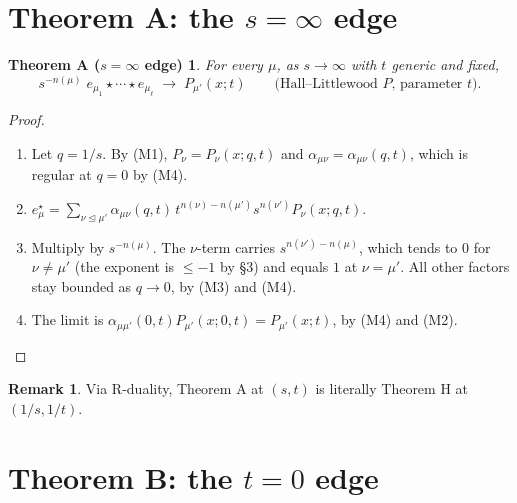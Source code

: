 \documentclass[11pt]{article}
\newtheorem*{theoremA}{Theorem A ($s=\infty$ edge)}
\theoremstyle{definition}
\newtheorem*{remark}{Remark}
\newcommand{\domd}{\trianglelefteq}
\begin{document}
\section{\texorpdfstring{Theorem A: the $s=\infty$ edge}{Theorem A: the s = infinity edge}}

\begin{theoremA}
For every $\mu$, as $s\to\infty$ with $t$ generic and fixed,
\[
s^{-n(\mu)}\;e_{\mu_1}\star\cdots\star e_{\mu_\ell}\;\longrightarrow\;P_{\mu'}(x;t)\qquad\text{(Hall--Littlewood $P$, parameter $t$).}
\]
\end{theoremA}
\begin{proof}
\begin{enumerate}[nosep]
\item Let $q=1/s$. By (M1), $P_\nu=P_\nu(x;q,t)$ and $\alpha_{\mu\nu}=\alpha_{\mu\nu}(q,t)$, which is regular at $q=0$ by (M4).
\item $e^\star_\mu=\sum_{\nu\domd\mu'}\alpha_{\mu\nu}(q,t)\,t^{n(\nu)-n(\mu')}s^{n(\nu')}P_\nu(x;q,t)$.
\item Multiply by $s^{-n(\mu)}$. The $\nu$-term carries $s^{n(\nu')-n(\mu)}$, which tends to $0$ for $\nu\ne\mu'$ (the exponent is $\le-1$ by \S3) and equals $1$ at $\nu=\mu'$. All other factors stay bounded as $q\to0$, by (M3) and (M4).
\item The limit is $\alpha_{\mu\mu'}(0,t)P_{\mu'}(x;0,t)=P_{\mu'}(x;t)$, by (M4) and (M2).\qedhere
\end{enumerate}
\end{proof}
\begin{remark}
Via R-duality, Theorem A at $(s,t)$ is literally Theorem H at $(1/s,1/t)$.
\end{remark}

\section{\texorpdfstring{Theorem B: the $t=0$ edge}{Theorem B: the t = 0 edge}}
\end{document}
